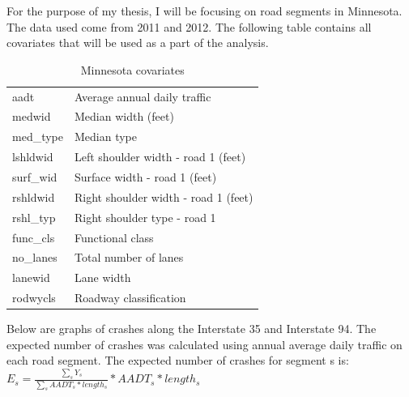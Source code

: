 For the purpose of my thesis, I will be focusing on road segments in Minnesota. The data used come from 2011 and 2012.  The following table contains all covariates that will be used as a part of the analysis. 

\begin{table}[h]
\centering
\caption{Minnesota covariates}
\label{my-label}
\begin{tabular}{@{}ll@{}}
\toprule
aadt      & Average annual daily traffic         \\ 
medwid    & Median width (feet)                  \\
med\_type & Median type                          \\
lshldwid  & Left shoulder width - road 1 (feet)  \\
surf\_wid & Surface width - road 1 (feet)        \\
rshldwid  & Right shoulder width - road 1 (feet) \\
rshl\_typ & Right shoulder type - road 1         \\
func\_cls & Functional class                     \\
no\_lanes & Total number of lanes                \\
lanewid   & Lane width                           \\
rodwycls  & Roadway classification               \\ \bottomrule
\end{tabular}
\end{table}

Below are graphs of crashes along the Interstate 35 and Interstate 94. The expected number of crashes was calculated using annual average daily traffic on each road segment. The expected number of crashes for segment s is: $E_s = \frac{\sum_s Y_s}{\sum_s AADT_s * length_s} * AADT_s * length_s$

